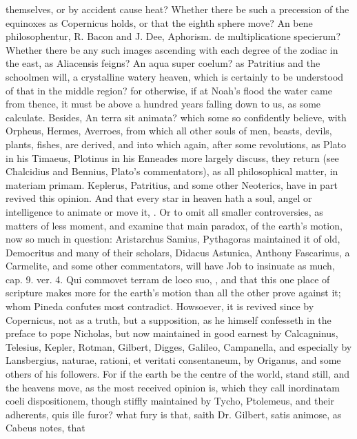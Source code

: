 {themselves, or by accident cause heat? Whether there be such a
precession of the equinoxes as Copernicus holds, or that the eighth
sphere move? An bene philosophentur, R. Bacon and J. Dee, Aphorism. de
multiplicatione specierum? Whether there be any such images ascending
with each degree of the zodiac in the east, as Aliacensis feigns? An
aqua super coelum? as Patritius and the schoolmen will, a crystalline
watery heaven, which is  certainly to be understood of that
in the middle region? for otherwise, if at Noah's flood the water came
from thence, it must be above a hundred years falling down to us, as
some calculate. Besides, An terra sit animata? which some so
confidently believe, with Orpheus, Hermes, Averroes, from which all
other souls of men, beasts, devils, plants, fishes, \etc{} are derived,
and into which again, after some revolutions, as Plato in his Timaeus,
Plotinus in his Enneades more largely discuss, they return (see
Chalcidius and Bennius, Plato's commentators), as all philosophical
matter, in materiam primam. Keplerus, Patritius, and some other
Neoterics, have in part revived this opinion. And that every star in
heaven hath a soul, angel or intelligence to animate or move it, \etc{}. Or
to omit all smaller controversies, as matters of less moment, and
examine that main paradox, of the earth's motion, now so much in
question: Aristarchus Samius, Pythagoras maintained it of old,
Democritus and many of their scholars, Didacus Astunica, Anthony
Fascarinus, a Carmelite, and some other commentators, will have Job to
insinuate as much, cap. 9. ver. 4. Qui commovet terram de loco suo,
\etc{}, and that this one place of scripture makes more for the earth's
motion than all the other prove against it; whom Pineda confutes most
contradict. Howsoever, it is revived since by Copernicus, not as a
truth, but a supposition, as he himself confesseth in the preface to
pope Nicholas, but now maintained in good earnest by 
Calcagninus, Telesius, Kepler, Rotman, Gilbert, Digges, Galileo,
Campanella, and especially by Lansbergius, naturae, rationi, et
veritati consentaneum, by Origanus, and some others of his
followers. For if the earth be the centre of the world, stand still,
and the heavens move, as the most received opinion is, which they
call inordinatam coeli dispositionem, though stiffly maintained by
Tycho, Ptolemeus, and their adherents, quis ille furor? \etc{} what fury
is that, saith Dr. Gilbert, satis animose, as Cabeus notes, that
}
